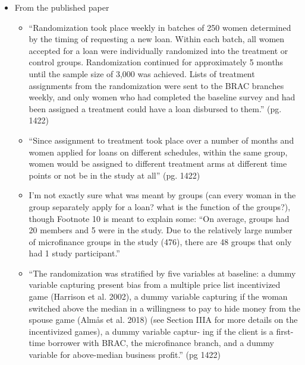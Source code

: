 \documentclass[]{article}
\begin{document}
\begin{itemize}
\begin{itemize}
\begin{itemize}
		\end{itemize}
		\item From the published paper
		\begin{itemize}
			\item ``Randomization took place weekly in batches of 250 women determined by the timing of requesting a new loan. Within each batch, all women accepted for a loan were individually randomized into the treatment or control groups. Randomization continued for approximately 5 months until the sample size of 3,000 was achieved. Lists of treatment assignments from the randomization were sent to the BRAC branches weekly, and only women who had completed the baseline survey and had been assigned a treatment could have a loan disbursed to them.'' (pg. 1422)
			\item ``Since assignment to treatment took place over a number of months and women applied for loans on different schedules, within the same group, women would be assigned to different treatment arms at different time points or not be in the study at all'' (pg. 1422) 
			\item I'm not exactly sure what was meant by groups (can every woman in the group separately apply for a loan? what is the function of the groups?), though Footnote 10 is meant to explain some: ``On average, groups had 20 members and 5 were in the study. Due to the relatively large number of microfinance groups in the study (476), there are 48 groups that only had 1 study participant.''
			\item ``The randomization was stratified by five variables at baseline: a dummy variable capturing present bias from a multiple price list incentivized game (Harrison et al. 2002), a dummy variable capturing if the woman switched above the median in a willingness to pay to hide money from the spouse game (Almås et al. 2018) (see Section IIIA for more details on the incentivized games), a dummy variable captur- ing if the client is a first-time borrower with BRAC, the microfinance branch, and a dummy variable for above-median business profit.'' (pg 1422)
		\end{itemize}
	\end{itemize}
\end{itemize}
\end{document}
